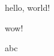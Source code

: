 \documentclass[uplatex]{article}
\begin{document}
\def\hello{hello}

\begin{buffer}[greet]
\hello, world!
\end{buffer}

\begin{buffer}[wow]
wow!
\end{buffer}

\getbuffer[greet]
\getbuffer[wow]


abc
\end{document}

